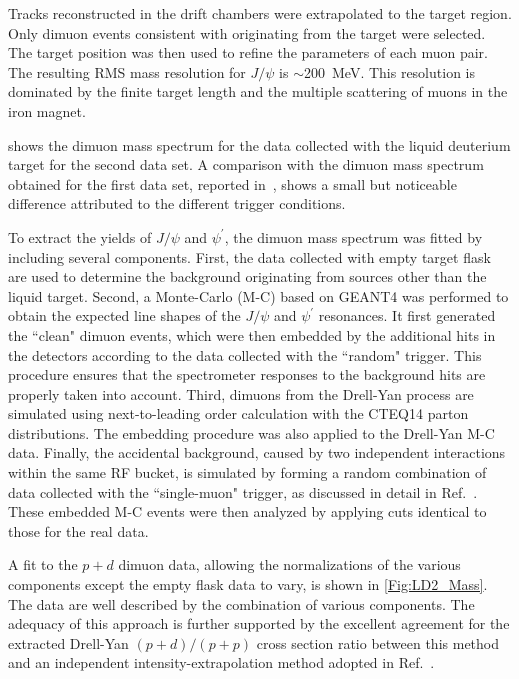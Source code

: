 \documentclass[reprint,aps,unsortedaddress,superscriptaddress,prd,floatfix,showpacs,linenumbers]{revtex4-2}
\begin{document}
Tracks reconstructed in the drift chambers were extrapolated
to the target region. Only dimuon events consistent with originating
from the target were selected. The target
position was then used to
refine the parameters of each muon pair. The resulting
RMS mass resolution for $J/\psi$ is $\sim$\SI{200}{\MeV}.
This resolution is dominated by the finite target length and the
multiple scattering of muons in the iron magnet.

 shows the dimuon mass spectrum for the data 
collected with the
liquid deuterium target for the second data set. A comparison with the 
dimuon mass spectrum obtained for the first data set, 
reported in~\cite{dove2023}, shows
a small but noticeable difference attributed to the different 
trigger conditions. 

To extract the yields of $J/\psi$ and
$\psi^\prime$, the dimuon mass spectrum was fitted by 
including several components. First, the
data collected with empty target flask
are used to determine the background originating from sources other than the
liquid target. Second, a Monte-Carlo (M-C) based on 
GEANT4 was performed to obtain the expected line shapes of the $J/\psi$ 
and $\psi^\prime$ resonances. It first generated the ``clean" 
dimuon events, which were then embedded by the additional hits in the detectors 
according to the data collected with the ``random" trigger. This
procedure ensures that the spectrometer responses to the background hits
are properly taken into account.
Third, dimuons from the Drell-Yan process are simulated using 
next-to-leading order
calculation with the CTEQ14 parton distributions.
The embedding procedure was also applied to the Drell-Yan M-C data.
Finally, the accidental background, caused by two independent 
interactions within the same RF bucket, is simulated
by forming a random combination of data collected with the 
``single-muon" trigger, as discussed in detail in Ref.~\cite{dove2023}.
These embedded M-C events were then analyzed by applying cuts identical 
to those for the real data.

A fit to the $p+d$ dimuon data, 
allowing the normalizations of
the various components except the empty flask data to vary, is 
shown in \cref{Fig:LD2_Mass}. 
The data are well described by the combination of various
components. The adequacy of this approach is further supported by the excellent
agreement for the extracted Drell-Yan $(p+d) / (p+p)$ cross section ratio 
between this method~\cite{dove2023} and an independent intensity-extrapolation
method adopted in Ref.~\cite{dove2021}.
\end{document}
